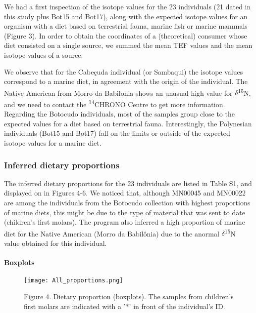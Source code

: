 \documentclass[]{article}
\let\oldparagraph\paragraph
\renewcommand{\paragraph}[1]{\oldparagraph{#1}\mbox{}}
\begin{document}
We had a first inspection of the isotope values for the 23 individuals
(21 dated in this study plus Bot15 and Bot17), along with the expected
isotope values for an organism with a diet based on terrestrial fauna,
marine fish or marine mammals (Figure 3). In order to obtain the
coordinates of a (theoretical) consumer whose diet consisted on a single
source, we summed the mean TEF values and the mean isotope values of a
source.

We observe that for the Cabeçuda individual (or Sambaqui) the isotope
values correspond to a marine diet, in agreement with the origin of the
individual. The Native American from Morro da Babilonia shows an unusual
high value for \(\delta\)\textsuperscript{15}N, and we need to contact
the \textsuperscript{14}CHRONO Centre to get more information. Regarding
the Botocudo individuals, most of the samples group close to the
expected values for a diet based on terrestrial fauna. Interestingly,
the Polynesian individuals (Bot15 and Bot17) fall on the limits or
outside of the expected isotope values for a marine diet.

\hypertarget{inferred-dietary-proportions}{%
\subsubsection{Inferred dietary
proportions}\label{inferred-dietary-proportions}}

The inferred dietary proportions for the 23 individuals are listed in
Table S1, and displayed on in Figures 4-6. We noticed that, although
MN00045 and MN00022 are among the individuals from the Botocudo
collection with highest proportions of marine diets, this might be due
to the type of material that was sent to date (children's first molars).
The program also inferred a high proportion of marine diet for the
Native American (Morro da Babilônia) due to the anormal
\(\delta\)\textsuperscript{15}N value obtained for this individual.

\hypertarget{boxplots}{%
\paragraph{Boxplots}\label{boxplots}}

\begin{figure}
\centering
\texttt{[image: All\_proportions.png]}
\caption{Figure 4. Dietary proportion (boxplots). The samples from
children's first molars are indicated with a '*' in front of the
individual's ID.}
\end{figure}
\end{document}
